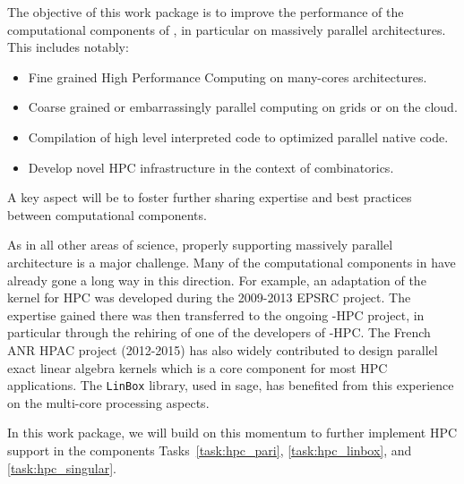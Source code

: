 \addtocounter{wpno}{1}
\begin{Workpackage}{\thewpno}
\label{wp:hpc}
\WPTitle{\wpname{\thewpno}}

\begin{WPObjectives}
  The objective of this work package is to improve the performance of
  the computational components of \TheProject, in particular on
  massively parallel architectures. This includes notably:
  \begin{itemize}
  \item Fine grained High Performance Computing on many-cores
    architectures.
  \item Coarse grained or embarrassingly parallel computing on grids
    or on the cloud.
  \item Compilation of high level interpreted code to optimized
    parallel native code.
  \item Develop novel HPC infrastructure in the context of
    combinatorics.
  \end{itemize}
  A key aspect will be to foster further sharing expertise and best
  practices between computational components.
\end{WPObjectives}

\begin{WPDescription}
  As in all other areas of science, properly supporting massively
  parallel architecture is a major challenge. Many of the
  computational components in \TheProject have already gone a long way
  in this direction. For example, an adaptation of the \GAP kernel for
  HPC was developed during the 2009-2013 EPSRC project. The expertise
  gained there was then transferred to the ongoing \Singular-HPC
  project, in particular through the rehiring of one of the developers
  of \GAP-HPC. The French ANR HPAC project (2012-2015) has also widely contributed to design
  parallel exact linear algebra kernels  which is a core component for most HPC
  applications. The \texttt{LinBox} library, used in sage, has benefited from this
  experience on the multi-core processing aspects. 

  In this work package, we will build on this momentum to further
  implement HPC support in the components Tasks~\ref{task:hpc_pari},
  \ref{task:hpc_linbox}, and \ref{task:hpc_singular}.


\end{WPDescription}
\end{Workpackage}
